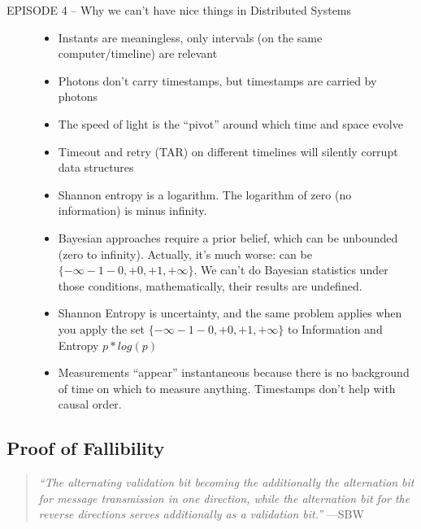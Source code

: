 \documentclass[../../../OAE-SPEC-MAIN.tex]{subfiles}
\begin{document}
\begin{description}
\item [EPISODE 4  -- Why we can’t have nice things in Distributed Systems] \mbox{}
	\begin{itemize}
	\item  Instants are meaningless, only intervals (on the same computer/timeline) are relevant
	\item  Photons don’t carry timestamps, but timestamps are carried by photons
	\item The speed of light is the ``pivot'' around which time and space evolve
	\item Timeout and retry (TAR) on different timelines will silently corrupt data structures
	\item  Shannon entropy is a logarithm. The logarithm of zero (no information) is minus infinity.
	\item  Bayesian approaches require a prior belief, which can be unbounded (zero to infinity). Actually, it’s much worse: can be $\{-\infty-1-0,+0,+1,+\infty\}$. We can’t do Bayesian statistics under those conditions, mathematically, their results are undefined.
	\item Shannon Entropy is uncertainty, and the same problem applies when you apply the set $\{-\infty-1-0,+0,+1,+\infty\}$ to Information and Entropy $p*log(p)$
	\item  Measurements ``appear'' instantaneous because there is no background of time on which to measure anything. Timestamps don’t help with causal order.
	\end{itemize}
\end{description}



\subsection{Proof of Fallibility}

\begin{quote}
\textit{``The alternating validation bit becoming the additionally the \emph{alternation} bit for message transmission in one direction, while the alternation bit for the reverse directions serves additionally as a validation bit.''} \hfill ---SBW \cite{SBW}
\end{quote}
\end{document}

